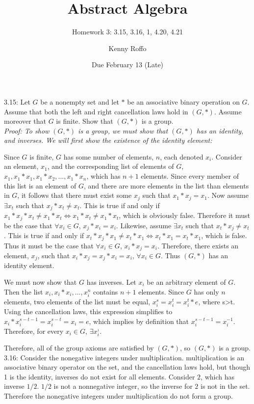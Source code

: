 \documentclass{scrartcl}
\title{Abstract Algebra}
\subtitle{Homework 3: 3.15, 3.16, 1, 4.20, 4.21}
\author{Kenny Roffo}
\date{Due February 13 (Late)}
\begin{document}
\maketitle

3.15: Let $G$ be a nonempty set and let $*$ be an associative binary operation on $G$. Assume that both the left and right cancellation laws hold in $(G,*)$. Assume moreover that $G$ is finite. Show that $(G,*)$ is a group.\\

\em Proof: \em To show $(G,*)$ is a group, we must show that $(G,*)$ has an identity, and inverses. We will first show the existence of the identity element:

Since $G$ is finite, $G$ has some number of elements, $n$, each denoted $x_i$. Consider an element, $x_1$, and the corresponding list of elements of $G$, ${x_1, x_1 * x_1, x_1 * x_2, ..., x_1 * x_n}$, which has $n+1$ elements. Since every member of this list is an element of $G$, and there are more elements in the list than elements in $G$, it follows that there must exist some $x_j$ such that $x_1*x_j=x_1$. Now assume $\exists x_t$ such that $x_j * x_t \ne x_t$. This is true if and only if $x_1 * x_j * x_t \ne x_1 * x_t \iff x_1 * x_t \ne x_1 * x_t$, which is obviously false. Therefore it must be the case that $\forall x_i \in G$, $x_j * x_i = x_i$. Likewise, assume $\exists x_t$ such that $x_t * x_j \ne x_t$. This is true if and only if $x_t * x_j * x_1 \ne x_t * x_1 \iff x_t * x_1 = x_t * x_1$, which is false. Thus it must be the case that $\forall x_i \in G$, $x_i * x_j = x_i$. Therefore, there exists an element, $x_j$, such that $x_i * x_j = x_j * x_i = x_i$, $\forall x_i \in G$. Thus $(G,*)$ has an identity element.

We must now show that $G$ has inverses. Let $x_i$ be an arbitrary element of $G$. Then the list $x_i, x_i * x_i, ... , x_i^n$ contains $n+1$ elements. Since $G$ has only $n$ elements, two elements of the list must be equal, $x_i^s=x_i^t=x_i^t*e$, where s>t. Using the cancellation laws, this expression simplifies to $x_i*x_i^{s-t-1}=x_i^{s-t}=x_i=e$, which implies by definition that $x_i^{s-t-1}=x_i^{-1}$. Therefore, for every $x_i \in G$, $\exists x_i^{_1}$.

Therefore, all of the group axioms are satisfied by $(G,*)$, so $(G,*)$ is a group.\\

3.16: Consider the nonegative integers under multiplication. multiplication is an associative binary operator on the set, and the cancellation laws hold, but though 1 is the identity, inverses do not exist for all elements. Consider $2$, which has inverse $1/2$. $1/2$ is not a nonnegative integer, so the inverse for $2$ is not in the set. Therefore the nonegative integers under multiplication do not form a group.\pagebreak
\end{document}
